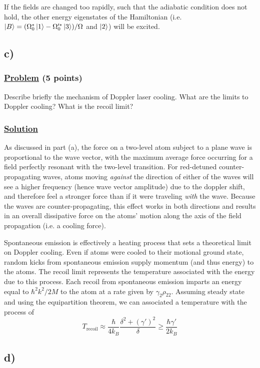 \documentclass[12pt]{article}
\begin{document}
If the fields are changed too rapidly, such that the adiabatic condition does not hold, the other energy eigenstates of the Hamiltonian (i.e. $\ket{B} = (\Omega_0^*\ket{1} - \Omega_0'^*\ket{3})/\Omega$ and $\ket{2}$) will be excited.

\subsection*{c)}
\subsubsection*{\underline{Problem} (5 points)}
Describe briefly the mechanism of Doppler laser cooling.
What are the limits to Doppler cooling? What is the recoil limit?

\subsubsection*{\underline{Solution}}
As discussed in part (a), the force on a two-level atom subject to a plane wave is proportional to the wave vector, with the maximum average force occurring for a field perfectly resonant with the two-level transition.
For red-detuned counter-propagating waves, atoms moving \textit{against} the direction of either of the waves will see a higher frequency (hence wave vector amplitude) due to the doppler shift, and therefore feel a stronger force than if it were traveling \textit{with} the wave.
Because the waves are counter-propagating, this effect works in both directions and results in an overall dissipative force on the atoms' motion along the axis of the field propagation (i.e. a cooling force).

Spontaneous emission is effectively a heating process that sets a theoretical limit on Doppler cooling.
Even if atoms were cooled to their motional ground state, random kicks from spontaneous emission supply momentum (and thus energy) to the atoms.
The recoil limit represents the temperature associated with the energy due to this process.
Each recoil from spontaneous emission imparts an energy equal to $\hbar^2k^2/2M$ to the atom at a rate given by $\gamma_2\rho_{22}$.
Assuming steady state and using the equipartition theorem, we can associated a temperature with the process of 
\[ T_\text{recoil} \approx \frac{\hbar}{4k_B}\frac{\delta^2 + (\gamma')^2}{\delta} \geq \frac{\hbar\gamma'}{2k_B} \]


\subsection*{d)}
\end{document}
